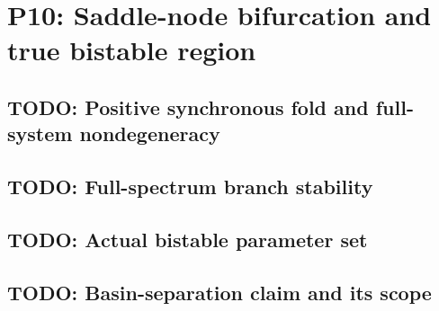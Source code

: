 
\section{P10: Saddle-node bifurcation and true bistable region}
\label{sec:P10}

\subsection{TODO: Positive synchronous fold and full-system nondegeneracy}
\label{slot:P10-1}

\subsection{TODO: Full-spectrum branch stability}
\label{slot:P10-2}

\subsection{TODO: Actual bistable parameter set}
\label{slot:P10-3}

\subsection{TODO: Basin-separation claim and its scope}
\label{slot:P10-4}
